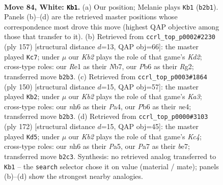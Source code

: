 \documentclass[11pt]{article}
\begin{document}
\clearpage

\begin{figure}[p]\centering
\begin{subfigure}{0.46\textwidth}\centering
\resizebox{\linewidth}{!}{%
\newchessgame
\chessboard[
  setfen={6k1/P7/1P5n/8/8/8/1K5r/4R3 w - - 3 84},
  showmover=false,
  pgfstyle=straightmove, color=movearrow, markmove={b2-b1}
]}
\caption{}
\end{subfigure}\hfill
\begin{subfigure}{0.46\textwidth}\centering
\resizebox{\linewidth}{!}{%
\newchessgame
\chessboard[
  setfen={8/1n1k4/8/8/1K6/8/6r1/1N1R4 b - - 12 79},
  showmover=false,
  pgfstyle=straightmove, color=movearrow, markmove={d7-c7}
]}
\caption{}
\end{subfigure}
\\[4pt]
\begin{subfigure}{0.46\textwidth}\centering
\resizebox{\linewidth}{!}{%
\newchessgame
\chessboard[
  setfen={6R1/8/8/8/P1k1n3/K6r/8/8 w - - 4 76},
  showmover=false,
  pgfstyle=straightmove, color=movearrow, markmove={a3-b2}
]}
\caption{}
\end{subfigure}\hfill
\begin{subfigure}{0.46\textwidth}\centering
\resizebox{\linewidth}{!}{%
\newchessgame
\chessboard[
  setfen={2r5/4b2k/4P3/P7/2K5/8/8/R7 w - - 1 87},
  showmover=false,
  pgfstyle=straightmove, color=movearrow, markmove={c4-d5}
]}
\caption{}
\end{subfigure}
\caption{\textbf{Move 84, White: \texttt{Kb1}.} (a) Our position; Melanie plays \texttt{Kb1} (\texttt{b2b1}). Panels (b)--(d) are the retrieved master positions whose correspondence most drove this move (highest QAP objective among those that transfer to it). (b) Retrieved from \texttt{ccrl\_top\_p0002\#2230} (ply 157) [structural distance $d$=13, QAP obj=66]: the master played \texttt{Kc7}; under $\mu$ our \emph{Kb2} plays the role of that game's \emph{Kd2}; cross-type roles: our \emph{R}e1 as their \emph{N}b7, our \emph{P}b6 as their \emph{R}g2; transferred move \texttt{b2b3}. (c) Retrieved from \texttt{ccrl\_top\_p0003\#1864} (ply 150) [structural distance $d$=15, QAP obj=57]: the master played \texttt{Kb2}; under $\mu$ our \emph{Kb2} plays the role of that game's \emph{Ka3}; cross-type roles: our \emph{n}h6 as their \emph{P}a4, our \emph{P}b6 as their \emph{n}e4; transferred move \texttt{b2b3}. (d) Retrieved from \texttt{ccrl\_top\_p0000\#3103} (ply 172) [structural distance $d$=15, QAP obj=45]: the master played \texttt{Kd5}; under $\mu$ our \emph{Kb2} plays the role of that game's \emph{Kc4}; cross-type roles: our \emph{n}h6 as their \emph{P}a5, our \emph{P}a7 as their \emph{b}e7; transferred move \texttt{b2c3}. Synthesis: no retrieved analog transferred to \texttt{Kb1} -- the \texttt{search} selector chose it on value (material / mate); panels (b)--(d) show the strongest nearby analogies.}
\label{fig:thought-m166}
\end{figure}
\end{document}
